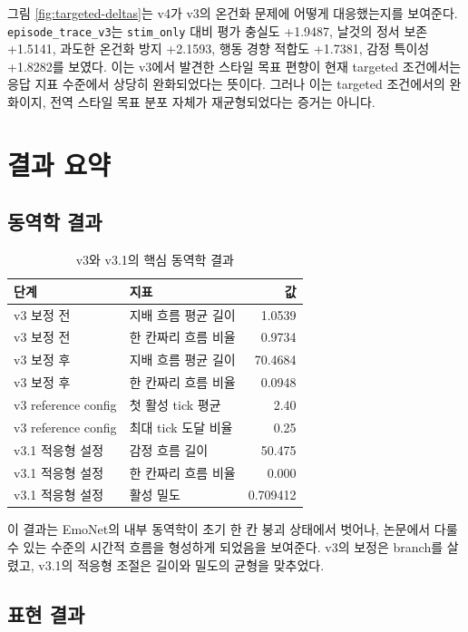\documentclass[11pt,a4paper]{article}
\newcommand{\eng}[1]{\texttt{#1}}
\begin{document}
그림 \ref{fig:targeted-deltas}는 v4가 v3의 온건화 문제에 어떻게 대응했는지를 보여준다. \eng{episode\_trace\_v3}는 \eng{stim\_only} 대비 평가 충실도 +1.9487, 날것의 정서 보존 +1.5141, 과도한 온건화 방지 +2.1593, 행동 경향 적합도 +1.7381, 감정 특이성 +1.8282를 보였다. 이는 v3에서 발견한 스타일 목표 편향이 현재 targeted 조건에서는 응답 지표 수준에서 상당히 완화되었다는 뜻이다. 그러나 이는 targeted 조건에서의 완화이지, 전역 스타일 목표 분포 자체가 재균형되었다는 증거는 아니다.

\section{결과 요약}

\subsection{동역학 결과}

\begin{table}[h]
\centering
\caption{v3와 v3.1의 핵심 동역학 결과}
\begin{tabularx}{\linewidth}{lXr}
\toprule
단계 & 지표 & 값 \\
\midrule
v3 보정 전 & 지배 흐름 평균 길이 & 1.0539 \\
v3 보정 전 & 한 칸짜리 흐름 비율 & 0.9734 \\
v3 보정 후 & 지배 흐름 평균 길이 & 70.4684 \\
v3 보정 후 & 한 칸짜리 흐름 비율 & 0.0948 \\
v3 reference config & 첫 활성 tick 평균 & 2.40 \\
v3 reference config & 최대 tick 도달 비율 & 0.25 \\
v3.1 적응형 설정 & 감정 흐름 길이 & 50.475 \\
v3.1 적응형 설정 & 한 칸짜리 흐름 비율 & 0.000 \\
v3.1 적응형 설정 & 활성 밀도 & 0.709412 \\
\bottomrule
\end{tabularx}
\end{table}

이 결과는 EmoNet의 내부 동역학이 초기 한 칸 붕괴 상태에서 벗어나, 논문에서 다룰 수 있는 수준의 시간적 흐름을 형성하게 되었음을 보여준다. v3의 보정은 branch를 살렸고, v3.1의 적응형 조절은 길이와 밀도의 균형을 맞추었다.

\subsection{표현 결과}
\end{document}
